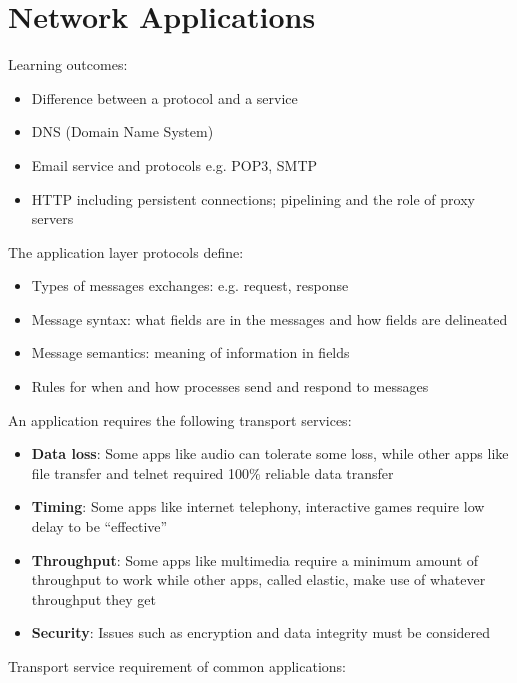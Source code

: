 \documentclass[twoside]{article}
\begin{document}
\section{Network Applications}
Learning outcomes:
\begin{itemize}
    \item Difference between a protocol and a service
    \item DNS (Domain Name System)
    \item Email service and protocols e.g. POP3, SMTP
    \item HTTP including persistent connections; pipelining and the role of 
    proxy servers
\end{itemize}
The application layer protocols define:
\begin{itemize}
    \item Types of messages exchanges: e.g. request, response
    \item Message syntax: what fields are in the messages and how fields are 
    delineated
    \item Message semantics: meaning of information in fields
    \item Rules for when and how processes send and respond to messages
\end{itemize}
An application requires the following transport services:
\begin{itemize}
    \item \textbf{Data loss}: Some apps like audio can tolerate some loss, while
    other apps like file transfer and telnet required 100\% reliable data transfer
    \item \textbf{Timing}: Some apps like internet telephony, interactive games 
    require low delay to be ``effective''
    \item \textbf{Throughput}: Some apps like multimedia require a minimum 
    amount of throughput to work while other apps, called elastic, make use of 
    whatever throughput they get
    \item \textbf{Security}: Issues such as encryption and data integrity must 
    be considered
\end{itemize}
Transport service requirement of common applications:
\end{document}
